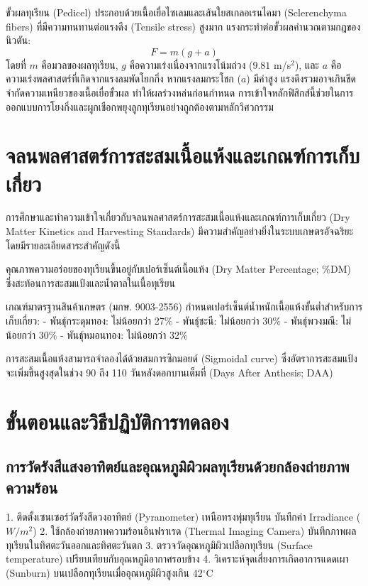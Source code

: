 ขั้วผลทุเรียน (Pedicel) ประกอบด้วยเนื้อเยื่อไซเลมและเส้นใยสเกลอเรนไคมา (Sclerenchyma fibers) ที่มีความทนทานต่อแรงดึง (Tensile stress) สูงมาก แรงกระทำต่อขั้วผลคำนวณตามกฎของนิวตัน:
\[ F = m(g + a) \]
โดยที่ $m$ คือมวลของผลทุเรียน, $g$ คือความเร่งเนื่องจากแรงโน้มถ่วง ($9.81$ m/s$^2$), และ $a$ คือความเร่งพลศาสตร์ที่เกิดจากแรงลมพัดโยกกิ่ง หากแรงลมกระโชก ($a$) มีค่าสูง แรงดึงรวมอาจเกินขีดจำกัดความเหนียวของเนื้อเยื่อขั้วผล ทำให้ผลร่วงหล่นก่อนกำหนด การเข้าใจหลักฟิสิกส์นี้ช่วยในการออกแบบการโยงกิ่งและผูกเชือกพยุงลูกทุเรียนอย่างถูกต้องตามหลักวิศวกรรม

\section{จลนพลศาสตร์การสะสมเนื้อแห้งและเกณฑ์การเก็บเกี่ยว}

การศึกษาและทำความเข้าใจเกี่ยวกับจลนพลศาสตร์การสะสมเนื้อแห้งและเกณฑ์การเก็บเกี่ยว (Dry Matter Kinetics and Harvesting Standards) มีความสำคัญอย่างยิ่งในระบบเกษตรอัจฉริยะ โดยมีรายละเอียดสาระสำคัญดังนี้

คุณภาพความอร่อยของทุเรียนขึ้นอยู่กับเปอร์เซ็นต์เนื้อแห้ง (Dry Matter Percentage; \%DM) ซึ่งสะท้อนการสะสมแป้งและน้ำตาลในเนื้อทุเรียน

เกณฑ์มาตรฐานสินค้าเกษตร (มกษ. 9003-2556) กำหนดเปอร์เซ็นต์น้ำหนักเนื้อแห้งขั้นต่ำสำหรับการเก็บเกี่ยว:
- พันธุ์กระดุมทอง: ไม่น้อยกว่า 27\%
- พันธุ์ชะนี: ไม่น้อยกว่า 30\%
- พันธุ์พวงมณี: ไม่น้อยกว่า 30\%
- พันธุ์หมอนทอง: ไม่น้อยกว่า 32\%

การสะสมเนื้อแห้งสามารถจำลองได้ด้วยสมการซิกมอยด์ (Sigmoidal curve) ซึ่งอัตราการสะสมแป้งจะเพิ่มขึ้นสูงสุดในช่วง 90 ถึง 110 วันหลังดอกบานเต็มที่ (Days After Anthesis; DAA)

\section{ขั้นตอนและวิธีปฏิบัติการทดลอง}

\subsection{การวัดรังสีแสงอาทิตย์และอุณหภูมิผิวผลทุเรียนด้วยกล้องถ่ายภาพความร้อน}
\begin{sensorbox}
1. ติดตั้งเซนเซอร์วัดรังสีดวงอาทิตย์ (Pyranometer) เหนือทรงพุ่มทุเรียน บันทึกค่า Irradiance ($W/m^2$)
2. ใช้กล้องถ่ายภาพความร้อนอินฟราเรด (Thermal Imaging Camera) บันทึกภาพผลทุเรียนในทิศตะวันออกและทิศตะวันตก
3. ตรวจวัดอุณหภูมิผิวเปลือกทุเรียน (Surface temperature) เปรียบเทียบกับอุณหภูมิอากาศรอบข้าง
4. วิเคราะห์จุดเสี่ยงการเกิดอาการแดดเผา (Sunburn) บนเปลือกทุเรียนเมื่ออุณหภูมิผิวสูงเกิน 42$^{\circ}$C
\end{sensorbox}

